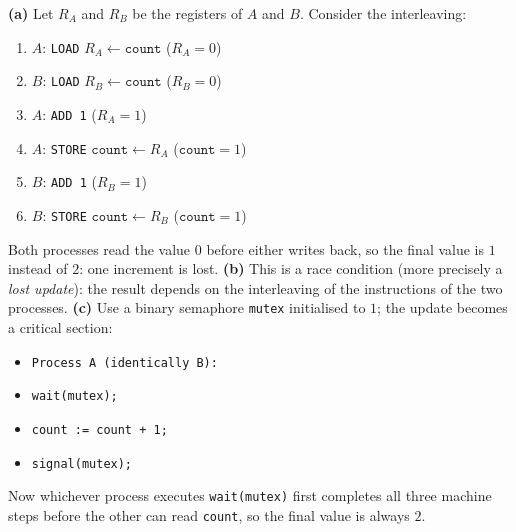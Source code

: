\documentclass[11pt]{article}
\newcommand{\cle}[1]{{\popxbold\color{popdark}#1}}
\begin{document}
\begin{corrige}
\textbf{(a)} Let $R_A$ and $R_B$ be the registers of $A$ and $B$. Consider the interleaving:
\begin{enumerate}
\item $A$: \texttt{LOAD} $R_A \leftarrow \texttt{count}$ \quad ($R_A = 0$)
\item $B$: \texttt{LOAD} $R_B \leftarrow \texttt{count}$ \quad ($R_B = 0$)
\item $A$: \texttt{ADD 1} \quad ($R_A = 1$)
\item $A$: \texttt{STORE} $\texttt{count} \leftarrow R_A$ \quad ($\texttt{count} = 1$)
\item $B$: \texttt{ADD 1} \quad ($R_B = 1$)
\item $B$: \texttt{STORE} $\texttt{count} \leftarrow R_B$ \quad ($\texttt{count} = 1$)
\end{enumerate}
Both processes read the value $0$ before either writes back, so the final value is $1$ instead of $2$: one increment is lost.
\textbf{(b)} This is a \cle{race condition} (more precisely a \emph{lost update}): the result depends on the interleaving of the instructions of the two processes.
\textbf{(c)} Use a binary semaphore \texttt{mutex} initialised to $1$; the update becomes a critical section:
\begin{itemize}
\item \texttt{Process A (identically B):}
\item \texttt{wait(mutex);}
\item \texttt{count := count + 1;}
\item \texttt{signal(mutex);}
\end{itemize}
Now whichever process executes \texttt{wait(mutex)} first completes all three machine steps before the other can read \texttt{count}, so the final value is always $2$.
\end{corrige}
\end{document}
